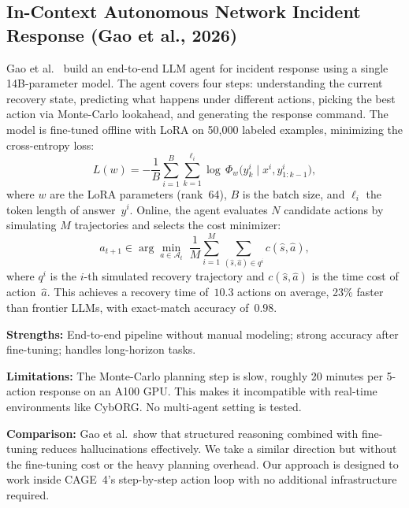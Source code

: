 \documentclass[letterpaper, 10 pt, conference]{ieeeconf}
\begin{document}
\subsection{\textbf{In-Context Autonomous Network Incident Response
            (Gao et al., 2026)}}
 
Gao et al.~\cite{arXiv:2602.13156} build an end-to-end LLM
agent for incident response using a single 14B-parameter model.
The agent covers four steps: understanding the current recovery
state, predicting what happens under different actions, picking
the best action via Monte-Carlo lookahead, and generating the
response command. The model is fine-tuned offline with LoRA on
50{,}000 labeled examples, minimizing the cross-entropy loss:
\begin{equation}
\label{eq:lora_loss}
  L(w) = -\frac{1}{B}\sum_{i=1}^{B}\sum_{k=1}^{\ell_i}
  \log\,\Phi_w\!\bigl(y^i_k \mid x^i, y^i_{1:k-1}\bigr),
\end{equation}
where $w$ are the LoRA parameters (rank~64), $B$ is the batch
size, and $\ell_i$ the token length of answer~$y^i$.
Online, the agent evaluates $N$ candidate actions by simulating
$M$ trajectories and selects the cost minimizer:
\begin{equation}
\label{eq:mc_q}
  a_{t+1} \in \arg\min_{a \in \mathcal{A}_t}\;
  \frac{1}{M}\sum_{i=1}^{M}\sum_{(\hat{s},\hat{a})\in q^i}
    c(\hat{s}, \hat{a}),
\end{equation}
where $q^i$ is the $i$-th simulated recovery trajectory and
$c(\hat{s},\hat{a})$ is the time cost of action~$\hat{a}$.
This achieves a recovery time of~$10.3$ actions on average,
23\% faster than frontier LLMs, with exact-match accuracy
of~$0.98$.
 
\textbf{Strengths:} End-to-end pipeline without manual
modeling; strong accuracy after fine-tuning; handles
long-horizon tasks.
 
\textbf{Limitations:} The Monte-Carlo planning step is slow,
roughly 20 minutes per 5-action response on an A100 GPU.
This makes it incompatible with real-time environments like
CybORG. No multi-agent setting is tested.
 
\textbf{Comparison:} Gao et al.\ show that structured reasoning
combined with fine-tuning reduces hallucinations effectively.
We take a similar direction but without the fine-tuning cost
or the heavy planning overhead. Our approach is designed to
work inside CAGE~4's step-by-step action loop with no
additional infrastructure required.
 
\end{document}
